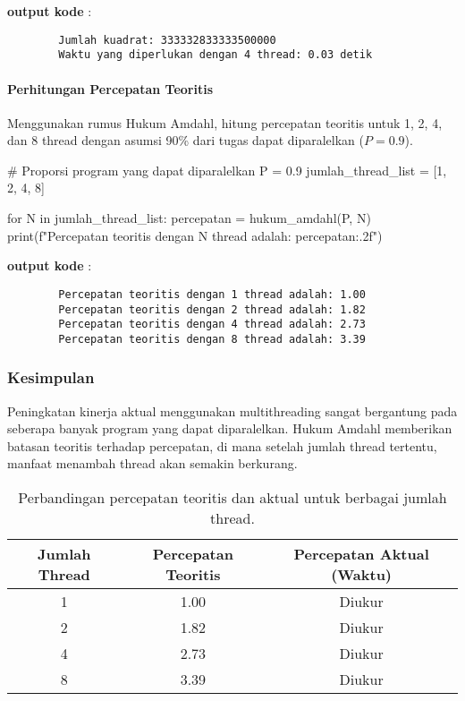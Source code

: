 \documentclass[12pt]{article}
\begin{document}
	\textbf{output kode} :
	\begin{verbatim}
		Jumlah kuadrat: 333332833333500000  
		Waktu yang diperlukan dengan 4 thread: 0.03 detik 
	\end{verbatim}
	
	\paragraph{Perhitungan Percepatan Teoritis}
	
	Menggunakan rumus Hukum Amdahl, hitung percepatan teoritis untuk 1, 2, 4, dan 8 thread dengan asumsi 90\% dari tugas dapat diparalelkan (\( P = 0.9 \)).
	
	\begin{python}
		# Proporsi program yang dapat diparalelkan
		P = 0.9
		jumlah_thread_list = [1, 2, 4, 8]
		
		for N in jumlah_thread_list:
		percepatan = hukum_amdahl(P, N)
		print(f"Percepatan teoritis dengan {N} thread adalah: {percepatan:.2f}")
	\end{python}
	
	\textbf{output kode} :
	\begin{verbatim}
		Percepatan teoritis dengan 1 thread adalah: 1.00
		Percepatan teoritis dengan 2 thread adalah: 1.82
		Percepatan teoritis dengan 4 thread adalah: 2.73
		Percepatan teoritis dengan 8 thread adalah: 3.39
	\end{verbatim}
	
	\subsubsection{Kesimpulan}
	Peningkatan kinerja aktual menggunakan multithreading sangat bergantung pada seberapa banyak program yang dapat diparalelkan. Hukum Amdahl memberikan batasan teoritis terhadap percepatan, di mana setelah jumlah thread tertentu, manfaat menambah thread akan semakin berkurang.
	
	\begin{table}[htbp]
		\centering
		\begin{tabular}{|c|c|c|}
			\hline
			Jumlah Thread & Percepatan Teoritis & Percepatan Aktual (Waktu) \\
			\hline
			1 & 1.00 & Diukur \\
			\hline
			2 & 1.82 & Diukur \\
			\hline
			4 & 2.73 & Diukur \\
			\hline
			8 & 3.39 & Diukur \\
			\hline
		\end{tabular}
		\caption{Perbandingan percepatan teoritis dan aktual untuk berbagai jumlah thread.}
		\label{tab:percepatan_perbandingan}
	\end{table}
	
\end{document}
